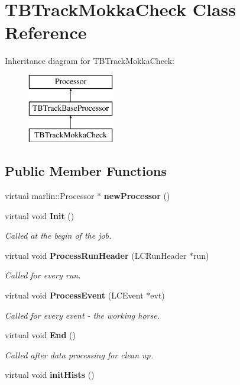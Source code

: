 \section{T\-B\-Track\-Mokka\-Check Class Reference}
\label{classTBTrackMokkaCheck}
Inheritance diagram for T\-B\-Track\-Mokka\-Check\-:\begin{figure}[H]
\begin{center}
\leavevmode
\includegraphics[height=3.000000cm]{classTBTrackMokkaCheck}
\end{center}
\end{figure}
\subsection*{Public Member Functions}
\begin{DoxyCompactItemize}
\item 
virtual marlin\-::\-Processor $\ast$ {\bfseries new\-Processor} ()\label{classTBTrackMokkaCheck_a53be3d2fd82b398eef9af471d4fd1f24}

\item 
virtual void {\bf Init} ()\label{classTBTrackMokkaCheck_abb8d8804a7ad6d130daa617910c82025}

\begin{DoxyCompactList}\small\item\em Called at the begin of the job. \end{DoxyCompactList}\item 
virtual void {\bf Process\-Run\-Header} (L\-C\-Run\-Header $\ast$run)\label{classTBTrackMokkaCheck_ae3ce319a159844c0b5eb130b52f823df}

\begin{DoxyCompactList}\small\item\em Called for every run. \end{DoxyCompactList}\item 
virtual void {\bf Process\-Event} (L\-C\-Event $\ast$evt)\label{classTBTrackMokkaCheck_ab7f2e45d6b34e294acf7be9084915031}

\begin{DoxyCompactList}\small\item\em Called for every event -\/ the working horse. \end{DoxyCompactList}\item 
virtual void {\bf End} ()\label{classTBTrackMokkaCheck_a10638273c995610da878db1eec2d27f6}

\begin{DoxyCompactList}\small\item\em Called after data processing for clean up. \end{DoxyCompactList}\item 
virtual void {\bfseries init\-Hists} ()\label{classTBTrackMokkaCheck_a8c6b1f94938fcfb5a5aa4639135dac83}

\end{DoxyCompactItemize}

